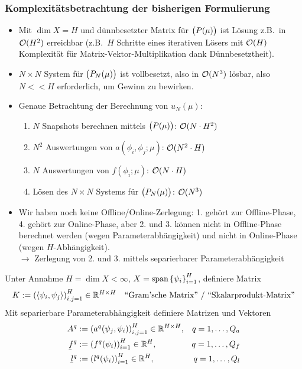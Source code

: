 \subsubsection*{Komplexitätsbetrachtung der bisherigen Formulierung}
\begin{itemize}
	\item Mit $\dim X = H$ und dünnbesetzter Matrix für $\big(P(\mu)\big)$ ist Lösung z.B.\ in $\mathcal O(H^2)$ erreichbar (z.B.\ $H$ Schritte eines iterativen Lösers mit $\mathcal O(H)$ Komplexität für Matrix-Vektor-Multiplikation dank Dünnbesetztheit).
	\item  $N \times N$ System für $\big(P_N(\mu)\big)$ ist vollbesetzt, also in $\mathcal O(N^3)$ lösbar, also $N << H$ erforderlich, um Gewinn zu bewirken.
	\item Genaue Betrachtung der Berechnung von $u_N(\mu)$:
		\begin{enumerate}[1.]
			\item $N$ Snapshots berechnen mittels $\big(P(\mu)\big)$: $\mathcal O(N \cdot H^2)$
			\item $N^2$ Auswertungen von $a(\phi_i,\phi_j;\mu)$: $\mathcal O(N^2 \cdot H)$
			\item $N$ Auswertungen von $f(\phi_i; \mu)$: $\mathcal O(N \cdot H)$
			\item Lösen des $N \times N$ Systems für $\big(P_N(\mu)\big)$: $\mathcal O(N^3)$
		\end{enumerate}
	\item Wir haben noch keine Offline/Online-Zerlegung: 1. gehört zur Offline-Phase, 4. gehört zur Online-Phase, aber 2. und 3. können nicht in Offline-Phase berechnet werden (wegen Parameterabhängigkeit) und nicht in Online-Phase (wegen $H$-Abhängigkeit).\\
		$\rightarrow$ Zerlegung von 2. und 3. mittels separierbarer Parameterabhängigkeit
\end{itemize}

\begin{defn}
	Unter Annahme $H = \dim X < \infty$, $X = \operatorname{span} \left\{\psi_i\right\}_{i=1}^H$, definiere Matrix
	\[
		K := \left(\langle \psi_i, \psi_j \rangle\right)_{i,j=1}^H \in \mathbb{R}^{H \times H} \quad \text{``Gram'sche Matrix'' / ``Skalarprodukt-Matrix''}
	\]
	Mit separierbare Parameterabhängigkeit definiere Matrizen und Vektoren
	\begin{align*}
		A^q &:= \seq{a^q(\psi_j,\psi_i)}_{i,j=1}^H \in \R^{H \times H}, & q = 1,\dots,Q_a \\
		\ubar f^q &:= \seq{f^q(\psi_i)}_{i=1}^H \in \R^H, & q = 1,\dots,Q_f \\
		\ubar l^q &:= \seq{l^q(\psi_i)}_{i=1}^H \in \R^H, & q = 1,\dots,Q_l
	\end{align*}
\end{defn}

